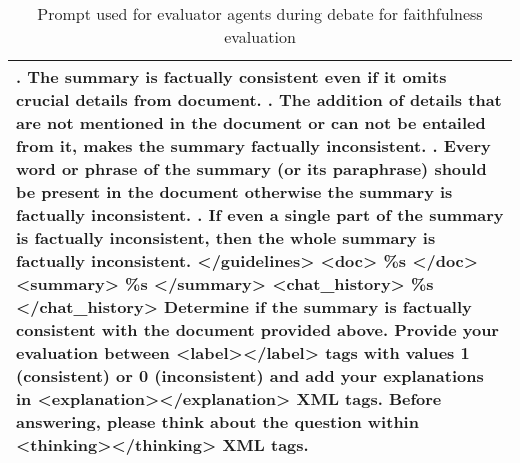 \begin{table*}
\begin{tabular}{@{}p{14cm}@{}}
    \newline
    10. The summary is factually consistent even if it omits crucial details from document.
    \newline
    11. The addition of details that are not mentioned in the document or can not be entailed from it, makes the summary factually inconsistent.
    \newline
    12. Every word or phrase of the summary (or its paraphrase) should be present in the document otherwise the summary is factually inconsistent.
    \newline
    13. If even a single part of the summary is factually inconsistent, then the whole summary is factually inconsistent.
    \newline
    </guidelines>
\newline
\newline
    <doc>
    \newline
    \%s
    \newline
    </doc>
    \newline
    \newline
    <summary>
    \newline
    \%s
    \newline
    </summary>
    \newline
    \newline
    <chat\_history>
    \newline
    \%s
    \newline
    </chat\_history>
    \newline
    \newline
    Determine if the summary is factually consistent with the document provided above. Provide your evaluation between <label></label> tags with values 1 (consistent) or 0 (inconsistent) and add your explanations in <explanation></explanation> XML tags. Before answering, please think about the question within <thinking></thinking> XML tags.
    \\ 
 \bottomrule
\end{tabular}
\caption{Prompt used for evaluator agents during debate for faithfulness evaluation}
\label{tab:debate_prompt}
\end{table*}